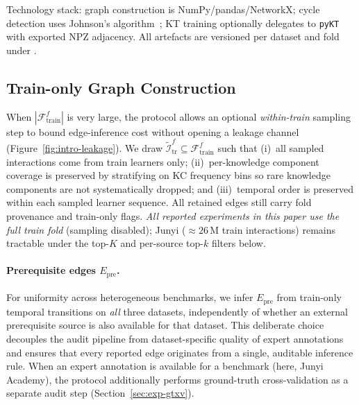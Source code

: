 \documentclass[pdflatex,sn-mathphys-num]{sn-jnl}
\newcommand{\Epre}{\ensuremath{E_{\text{pre}}}}
\newcommand{\KC}{knowledge component}
\newcommand{\KCs}{knowledge components}
\begin{document}
Technology stack: graph construction is NumPy/pandas/NetworkX; cycle
detection uses Johnson's algorithm~\cite{johnson1975finding}; KT training
optionally delegates to \texttt{pyKT}~\cite{liu2022pykt} with exported
NPZ adjacency. All artefacts are versioned per dataset and fold under
.

\subsection{Train-only Graph Construction}
\label{sec:graph}
When $|\mathcal{F}^f_{\text{train}}|$ is very large, the protocol allows
an optional \emph{within-train} sampling step to bound edge-inference cost
without opening a leakage channel (Figure~\ref{fig:intro-leakage}).
We draw $\tilde{\mathcal{I}}^f_{\text{tr}}\subseteq\mathcal{F}^f_{\text{train}}$
such that (i)~all sampled interactions come from train learners only;
(ii)~per-\KC{} coverage is preserved by stratifying on KC frequency bins so
rare \KCs{} are not systematically dropped; and (iii)~temporal order is
preserved within each sampled learner sequence. All retained edges still
carry fold provenance and train-only flags. \emph{All reported experiments
in this paper use the full train fold} (sampling disabled); Junyi
(${\approx}26$\,M train interactions) remains tractable under the
top-$K$ and per-source top-$k$ filters below.

\paragraph{Prerequisite edges $\Epre$.}
For uniformity across heterogeneous benchmarks, we infer $\Epre$ from
train-only temporal transitions on \emph{all} three datasets,
independently of whether an external prerequisite source is also
available for that dataset. This deliberate choice decouples the audit
pipeline from dataset-specific quality of expert annotations and
ensures that every reported edge originates from a single, auditable
inference rule. When an expert annotation is available for a benchmark
(here, Junyi Academy), the protocol additionally performs ground-truth
cross-validation as a separate audit step (Section~\ref{sec:exp-gtxv}).
\end{document}
